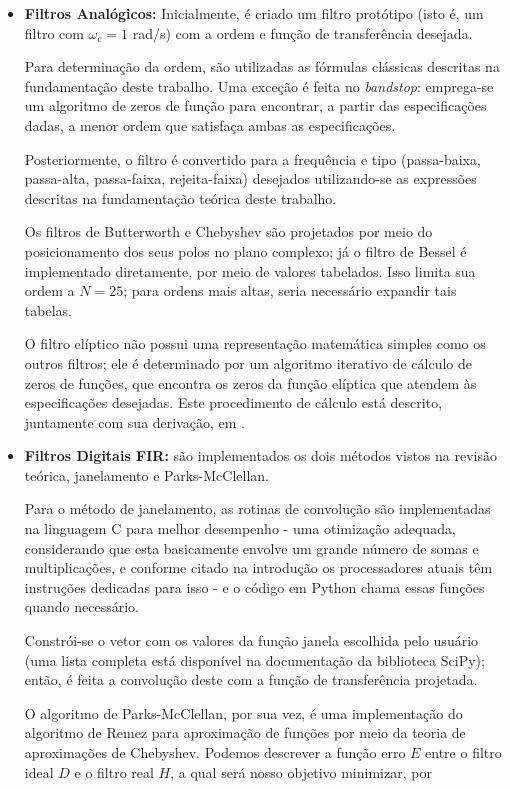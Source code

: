 \begin{itemize}
\item{\textbf{Filtros Analógicos:}} Inicialmente, é criado um filtro protótipo (isto é, um filtro com $\omega_c = 1$ rad/s) com a ordem e função de transferência desejada. 

Para determinação da ordem, são utilizadas as fórmulas clássicas descritas na fundamentação deste trabalho. Uma exceção é feita no \textit{bandstop}: emprega-se um algoritmo de zeros de função para encontrar, a partir das especificações dadas, a menor ordem que satisfaça ambas as especificações.

Posteriormente, o filtro é convertido para a frequência e tipo (passa-baixa, passa-alta, passa-faixa, rejeita-faixa) desejados utilizando-se as expressões descritas na fundamentação teórica deste trabalho.

Os filtros de Butterworth e Chebyshev são projetados por meio do posicionamento dos seus polos no plano complexo; já o filtro de Bessel é implementado diretamente, por meio de valores tabelados. Isso limita sua ordem a $N = 25$; para ordens mais altas, seria necessário expandir tais tabelas.

O filtro elíptico não possui uma representação matemática simples como os outros filtros; ele é determinado por um algoritmo iterativo de cálculo de zeros de funções, que encontra os zeros da função elíptica que atendem às especificações desejadas. Este procedimento de cálculo está descrito, juntamente com sua derivação, em \cite{orfanidis}.

\item{\textbf{Filtros Digitais FIR:}} são implementados os dois métodos vistos na revisão teórica, janelamento e Parks-McClellan.

Para o método de janelamento, as rotinas de convolução são implementadas na linguagem C para melhor desempenho - uma otimização adequada, considerando que esta basicamente envolve um grande número de somas e multiplicações, e conforme citado na introdução os processadores atuais têm instruções dedicadas para isso - e o código em Python chama essas funções quando necessário. 

Constrói-se o vetor com os valores da função janela escolhida pelo usuário (uma lista completa está disponível na documentação da biblioteca SciPy); então, é feita a convolução deste com a função de transferência projetada.

O algoritmo de Parks-McClellan, por sua vez, é uma implementação do algoritmo de Remez para aproximação de funções por meio da teoria de aproximações de Chebyshev. Podemos descrever a função erro $E$ entre o filtro ideal $D$ e o filtro real $H$, a qual será nosso objetivo minimizar, por 


\end{itemize}
